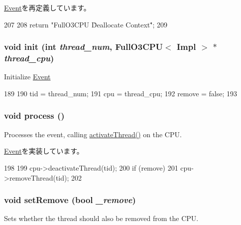 \hyperlink{classEvent_a130ddddf003422b413e2e891b1b80e8f}{Event}を再定義しています。


\begin{DoxyCode}
207 {
208     return "FullO3CPU \"Deallocate Context\"";
209 }
\end{DoxyCode}
\hypertarget{classFullO3CPU_1_1DeallocateContextEvent_a0938c51f296f212d5f6f05d174558612}{
\subsubsection[{init}]{\setlength{\rightskip}{0pt plus 5cm}void init (int {\em thread\_\-num}, \/  {\bf FullO3CPU}$<$ Impl $>$ $\ast$ {\em thread\_\-cpu})}}
\label{classFullO3CPU_1_1DeallocateContextEvent_a0938c51f296f212d5f6f05d174558612}
Initialize \hyperlink{classEvent}{Event} 


\begin{DoxyCode}
189 {
190     tid = thread_num;
191     cpu = thread_cpu;
192     remove = false;
193 }
\end{DoxyCode}
\hypertarget{classFullO3CPU_1_1DeallocateContextEvent_a2e9c5136d19b1a95fc427e0852deab5c}{
\subsubsection[{process}]{\setlength{\rightskip}{0pt plus 5cm}void process ()}}
\label{classFullO3CPU_1_1DeallocateContextEvent_a2e9c5136d19b1a95fc427e0852deab5c}
Processes the event, calling \hyperlink{classFullO3CPU_a687aa4600423bb30ecf3bb1da6cd6000}{activateThread()} on the CPU. 

\hyperlink{classEvent_a142b75b68a6291400e20fb0dd905b1c8}{Event}を実装しています。


\begin{DoxyCode}
198 {
199     cpu->deactivateThread(tid);
200     if (remove)
201         cpu->removeThread(tid);
202 }
\end{DoxyCode}
\hypertarget{classFullO3CPU_1_1DeallocateContextEvent_afcccb6b285c8de11c79413e7d2d33928}{
\subsubsection[{setRemove}]{\setlength{\rightskip}{0pt plus 5cm}void setRemove (bool {\em \_\-remove})}}
\label{classFullO3CPU_1_1DeallocateContextEvent_afcccb6b285c8de11c79413e7d2d33928}
Sets whether the thread should also be removed from the CPU. 


